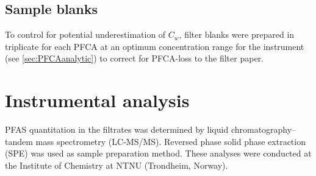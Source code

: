 \subsection{Sample blanks}
To control for potential underestimation of $C_w$, filter blanks were prepared in triplicate for each PFCA at an optimum concentration range for the instrument (see \cref{sec:PFCAanalytic}) to correct for PFCA-loss to the filter paper. 


\section{Instrumental analysis} \label{methods:instrAnalysis}
PFAS quantitation in the filtrates was determined by liquid chromatography--tandem mass spectrometry (LC-MS/MS). Reversed phase solid phase extraction (SPE) was used as sample preparation method. These analyses were conducted at the Institute of Chemistry at NTNU (Trondheim, Norway).

